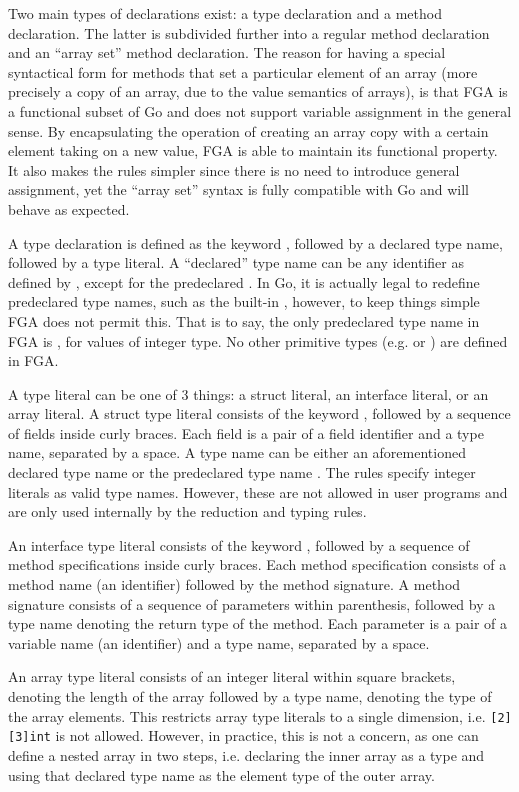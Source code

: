 Two main types of declarations exist: a type declaration and a method
declaration. The latter is subdivided further into a regular method declaration
and an ``array set'' method declaration. The reason for having a special
syntactical form for methods that set a particular element of an array (more
precisely a copy of an array, due to the value semantics of arrays), is that
FGA is a functional subset of Go and does not support variable assignment in
the general sense. By encapsulating the operation of creating an array copy with
a certain element taking on a new value, FGA is able to maintain its functional
property. It also makes the rules simpler since there is no need to introduce
general assignment, yet the ``array set'' syntax is fully compatible with Go and
will behave as expected.

A type declaration is defined as the keyword \type, followed by a declared type
name, followed by a type literal. A ``declared'' type name can be any identifier
as defined by \autocite{spec}, except for the predeclared . In Go, it is
actually legal to redefine predeclared type names, such as the built-in
, however, to keep things simple FGA does not permit this. That is to
say, the only predeclared type name in FGA is , for values of integer
type. No other primitive types (e.g.  or ) are defined in
FGA.

A type literal can be one of 3 things: a struct literal, an interface literal,
or an array literal. A struct type literal consists of the keyword \struct,
followed by a sequence of fields inside curly braces. Each field is a pair of a
field identifier and a type name, separated by a space. A type name can be
either an aforementioned declared type name or the predeclared type name
. The rules specify integer literals as valid type names. However, these
are not allowed in user programs and are only used internally by the reduction
and typing rules.

An interface type literal consists of the keyword \interface, followed by a
sequence of method specifications inside curly braces. Each method specification
consists of a method name (an identifier) followed by the method signature. A
method signature consists of a sequence of parameters within parenthesis,
followed by a type name denoting the return type of the method. Each parameter
is a pair of a variable name (an identifier) and a type name, separated by a
space.

An array type literal consists of an integer literal within square brackets,
denoting the length of the array followed by a type name, denoting the type of
the array elements. This restricts array type literals to a single dimension,
i.e. \texttt{[2][3]int} is not allowed. However, in practice, this is not a
concern, as one can define a nested array in two steps, i.e. declaring the inner
array as a type and using that declared type name as the element type of the
outer array.

